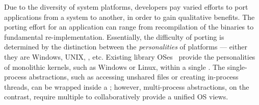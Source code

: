 Due to the diversity of system platforms,
developers pay varied efforts to port applications
from a system to another,
in order to gain qualitative benefits.
The porting effort for an application can range from
recompilation of the binaries
to fundamental re-implementation.
Essentially,
the difficulty of porting is determined by the distinction between the \emph{personalities} of platforms
--- either they are Windows, UNIX, \liboses{}, etc.
Existing library OSes~\cite{porter11drawbridge, baumann13bascule, baumann14haven}
provide the personalities of monolithic kernels, such as Windows or Linux,
within a single \picoproc{}.
The single-process abstractions,
such as accessing unshared files or creating in-process threads,
can be wrapped inside a \libos{};
however, multi-process abstractions, on the contrast, require
multiple \picoprocs{} to collaboratively provide a unified OS views.



